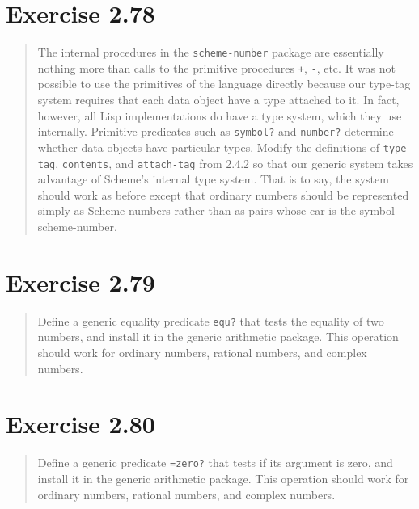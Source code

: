 \documentclass{article}
\begin{document}
\section{Exercise 2.78}
\begin{quote}
    The internal procedures in the \texttt{scheme-number} package are
    essentially nothing more than calls to the primitive procedures \texttt{+},
    \texttt{-}, etc. It was not possible to use the primitives of the language
    directly because our type-tag system requires that each data object have a
    type attached to it. In fact, however, all Lisp implementations do have a
    type system, which they use internally. Primitive predicates such as
    \texttt{symbol?} and \texttt{number?} determine whether data objects have
    particular types. Modify the definitions of \texttt{type-tag},
    \texttt{contents}, and \texttt{attach-tag} from 2.4.2 so that our generic
    system takes advantage of Scheme's internal type system. That is to say,
    the system should work as before except that ordinary numbers should be
    represented simply as Scheme numbers rather than as pairs whose car is the
    symbol scheme-number.
\end{quote}



\section{Exercise 2.79}
\begin{quote}
    Define a generic equality predicate \texttt{equ?} that tests the equality
    of two numbers, and install it in the generic arithmetic package. This
    operation should work for ordinary numbers, rational numbers, and complex
    numbers.
\end{quote}



\section{Exercise 2.80}
\begin{quote}
    Define a generic predicate \texttt{=zero?} that tests if its argument is
    zero, and install it in the generic arithmetic package. This operation
    should work for ordinary numbers, rational numbers, and complex numbers.
\end{quote}
\end{document}
